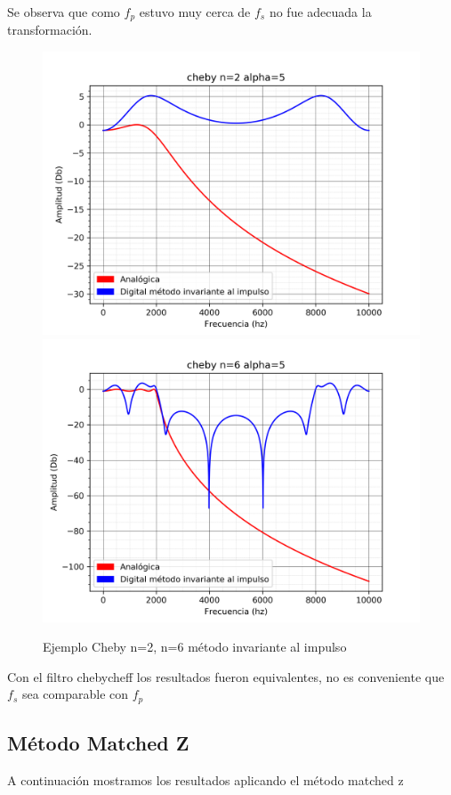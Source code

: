 \documentclass[assd_guia_filtros_recursivos_main.tex]{subfiles}
\begin{document}
Se observa que como $f_p$ estuvo muy cerca de $f_s$ no fue adecuada la transformación.

\begin{figure}[H]	
	\centering
	\includegraphics[scale=0.4]{output/cheby/alpha=5/cheby_n=2.png}
	\includegraphics[scale=0.4]{output/cheby/alpha=5/cheby_n=6.png}
	\caption{Ejemplo Cheby n=2, n=6 método invariante al impulso}
	\label{fig:Caso 2}
\end{figure}

Con el filtro chebycheff los resultados fueron equivalentes, no es conveniente que $f_s$ sea comparable con $f_p$

\subsection{Método Matched Z}
A continuación mostramos los resultados aplicando el método matched z
\end{document}
